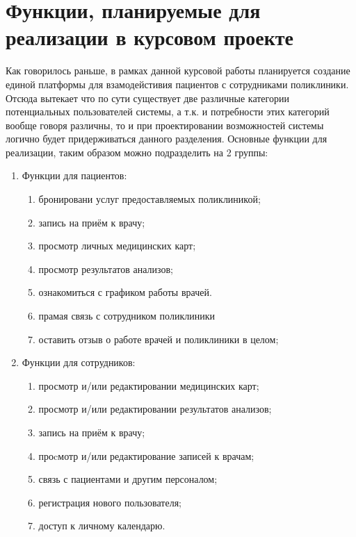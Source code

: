 \documentclass[14pt,a4paper,russian]{extreport}
\begin{document}
\section{Функции, планируемые для реализации в курсовом проекте}
Как говорилось раньше, в рамках данной курсовой работы планируется создание единой платформы для
взамодейстивия пациентов с сотрудниками поликлиники. Отсюда вытекает что по сути существует две
различные категории потенциальных пользователей системы, а т.к. и потребности этих категорий вообще
говоря различны, то и при проектировании возможностей системы логично будет придерживаться данного
разделения. Основные функции для реализации, таким образом можно подразделить на 2 группы: 
\begin{enumerate}[noitemsep]
    \item Функции для пациентов:
        \begin{enumerate}[noitemsep]
            \item бронировани услуг предоставляемых поликлиникой;
            \item запись на приём к врачу;
            \item просмотр личных медицинских карт;
            \item просмотр результатов анализов;
            \item ознакомиться с графиком работы врачей.
            \item прамая связь с сотрудником поликлиники
            \item оставить отзыв о работе врачей и поликлиники в целом;
        \end{enumerate}
    \item Функции для сотрудников:
        \begin{enumerate}
            \item просмотр и/или редактировании медицинских карт;
            \item просмотр и/или редактировании результатов анализов;
            \item запись на приём к врачу;
            \item проcмотр и/или редактирование записей к врачам;
            \item связь с пациентами и другим персоналом;
            \item регистрация нового пользователя;
            \item доступ к личному календарю.
        \end{enumerate}
\end{enumerate}
\end{document}
